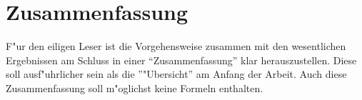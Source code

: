 \newpage
\chapter{Zusammenfassung}
F"ur den eiligen Leser ist die Vorgehensweise zusammen mit den
wesentlichen Ergebnissen am Schluss in einer ``Zusammenfassung'' klar
herauszustellen. Diese soll ausf"uhrlicher sein als die  ''"Ubersicht'' am Anfang der Arbeit. Auch diese Zusammenfassung soll m"oglichst keine Formeln enthalten.

